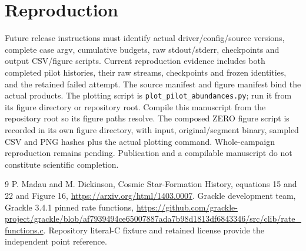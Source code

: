 \documentclass[11pt]{article}
\begin{document}
\section{Reproduction}
Future release instructions must identify actual driver/config/source versions, complete case argv, cumulative budgets, raw stdout/stderr, checkpoints and output CSV/figure scripts. Current reproduction evidence includes both completed pilot histories, their raw streams, checkpoints and frozen identities, and the retained failed attempt. The source manifest and figure manifest bind the actual products. The plotting script is \texttt{plot\_pilot\_abundances.py}; run it from its figure directory or repository root. Compile this manuscript from the repository root so its figure paths resolve. The composed ZERO figure script is recorded in its own figure directory, with input, original/segment binary, sampled CSV and PNG hashes plus the actual plotting command. Whole-campaign reproduction remains pending. Publication and a compilable manuscript do not constitute scientific completion.
\begin{thebibliography}{9}
 P. Madau and M. Dickinson, Cosmic Star-Formation History, equations 15 and 22 and Figure 16, \url{https://arxiv.org/html/1403.0007}.
 Grackle development team, Grackle 3.4.1 pinned rate functions, \url{https://github.com/grackle-project/grackle/blob/af7939494ce65007887ada7b98d1813df6843346/src/clib/rate_functions.c}. Repository literal-C fixture and retained license provide the independent point reference.
\end{thebibliography}
\end{document}
